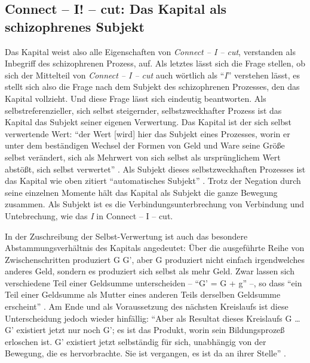 \documentclass[12pt,
               paper=a4,
               twoside=false,
               onehalfspacing,
               bibliography=totoc,
               toc=graduated,
               ]{scrartcl}
\newcommand{\pc}[2]{\parencite[#1]{#2}}
\newcommand{\cic}{Connect -- I -- cut\xspace}
\begin{document}


\subsection{Connect -- I! -- cut: Das Kapital als schizophrenes Subjekt}

Das Kapital weist also alle Eigenschaften von \emph{\cic}, verstanden
als Inbegriff des schizophrenen Prozess, auf. Als letztes lässt sich
die Frage stellen, ob sich der Mittelteil von \emph{\cic} auch
wörtlich als "`\emph{I}"' verstehen lässt, es stellt sich also die
Frage nach dem Subjekt des schizophrenen Prozesses, den das Kapital
vollzieht. Und diese Frage lässt sich eindeutig beantworten. Als
selbstreferenzieller, sich selbst steigernder, selbstzweckhafter
Prozess ist das Kapital das Subjekt seiner eigenen Verwertung. Das
Kapital ist der sich selbst verwertende Wert: "`der Wert [wird] hier
das Subjekt eines Prozesses, worin er unter dem beständigen Wechsel
der Formen von Geld und Ware seine Größe selbst verändert, sich als
Mehrwert von sich selbst als ursprünglichem Wert abstößt, sich selbst
verwertet"' \pc{169}{kap}. Als Subjekt dieses selbstzweckhaften
Prozesses ist das Kapital wie oben zitiert "`automatisches Subjekt"'
\pc{169}{kap}. Trotz der Negation durch seine einzelnen Momente hält
das Kapital als Subjekt die ganze Bewegung zusammen. Als Subjekt ist
es die Verbindungsunterbrechung von Verbindung und Untebrechung, wie
das \emph{I} in \cic.

In der Zuschreibung der Selbst-Verwertung ist auch das besondere \glq
Abstammungsverhältnis\grq{} des Kapitals angedeutet: Über die
ausgeführte Reihe von Zwischenschritten \glq produziert\grq{} G G',
aber G \glq produziert\grq{} nicht einfach irgendwelches anderes Geld,
sondern es produziert sich selbst als mehr Geld. Zwar lassen sich
verschiedene Teil einer Geldsumme unterscheiden -- "`G' = G + g"'
\pc{51}{kap2} --, so dass "`ein Teil einer Geldsumme als Mutter eines
anderen Teils derselben Geldsumme erscheint"' \pc{55}{kap2}. Am Ende
und als Voraussetzung des nächsten Kreislaufs ist diese Unterscheidung
jedoch wieder hinfällig: "`Aber als Resultat dieses Kreislaufs G \dots
G' existiert jetzt nur noch G'; es ist das Produkt, worin sein
Bildungsprozeß erloschen ist. G' existiert jetzt selbständig für sich,
unabhängig von der Bewegung, die es hervorbrachte. Sie ist vergangen,
es ist da an ihrer Stelle"' \pc{49}{kap2}.
\end{document}
